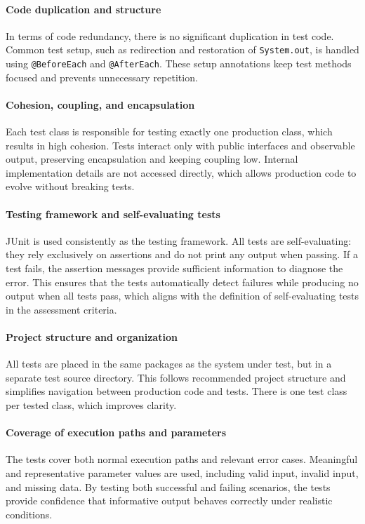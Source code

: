 \documentclass[a4paper]{scrartcl}
\begin{document}
\paragraph{Code duplication and structure}
In terms of code redundancy, there is no significant duplication in test code. Common test setup, such as redirection and restoration of \texttt{System.out}, is handled using \texttt{@BeforeEach} and \texttt{@AfterEach}. These setup annotations keep test methods focused and prevents unnecessary repetition.

\paragraph{Cohesion, coupling, and encapsulation}
Each test class is responsible for testing exactly one production class, which results in high cohesion. Tests interact only with public interfaces and observable output, preserving encapsulation and keeping coupling low. Internal implementation details are not accessed directly, which allows production code to evolve without breaking tests.

\paragraph{Testing framework and self-evaluating tests}
JUnit is used consistently as the testing framework. All tests are self-evaluating: they rely exclusively on assertions and do not print any output when passing. If a test fails, the assertion messages provide sufficient information to diagnose the error. This ensures that the tests automatically detect failures while producing no output when all tests pass, which aligns with the definition of self-evaluating tests in the assessment criteria.

\paragraph{Project structure and organization}
All tests are placed in the same packages as the system under test, but in a separate test source directory. This follows recommended project structure and simplifies navigation between production code and tests. 
There is one test class per tested class, which improves clarity.

\paragraph{Coverage of execution paths and parameters}
The tests cover both normal execution paths and relevant error cases. Meaningful and representative parameter values are used, including valid input, invalid input, and missing data. By testing both successful and failing scenarios, the tests provide confidence that informative output behaves correctly under realistic conditions.
\end{document}
